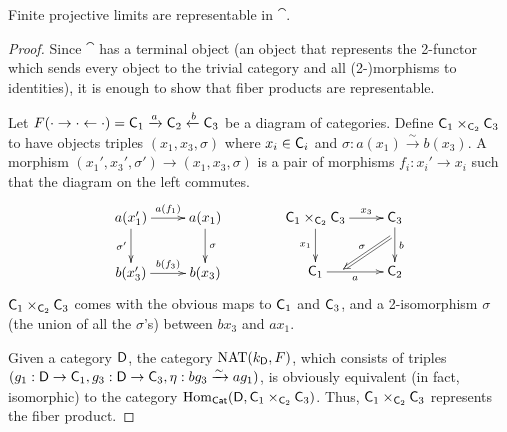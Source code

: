  \begin{lemma} \label{ApdxL:proj_limits_in_CAT}
   Finite projective limits are representable in $\cat$.
 \end{lemma}
 \begin{proof}
   Since $\cat$ has a terminal object (an object that represents the 2-functor which
   sends every object to the trivial category and all (2-)morphisms to identities), it is
   enough to show that fiber products are representable.

   Let $F(\cdot\to \cdot\leftarrow \cdot)=\text{\sf C}_1\xrightarrow a \text{\sf C}_2 \xleftarrow b \text{\sf C}_3$ be
   a diagram of categories. Define $\text{\sf C}_1\times_{\text{\sf C}_2}\text{\sf C}_3$ to have objects triples
   $(x_1,x_3,\sigma)$ where $x_i\in \text{\sf C}_i$ and $\sigma:a(x_1)\xrightarrow\sim b(x_3)$. A
   morphism $(x_1',x_3',\sigma')\to (x_1,x_3,\sigma)$ is a pair of morphisms $f_i:x_i'\to
   x_i$ such that the diagram on the left commutes.
   \[\xymatrix{
    a(x_1')\ar[r]^{a(f_1)}\ar[d]_{\sigma'} & a(x_1) \ar[d]^\sigma\\
    b(x_3')\ar[r]^{b(f_3)}& b(x_3)
   }\qquad\qquad
   \xymatrix{
    \C_1\times_{\C_2}\C_3 \ar[r]^<>(.5){x_3}\ar[d]_{x_1} & \C_3\ar[d]^b_(.3){}="a"\\
    \C_1 \ar[r]_a^(.3){}="b" & \C_2 \ar@{=>}_\sigma "a";"b"
   }\]
    $\text{\sf C}_1\times_{\text{\sf C}_2}\text{\sf C}_3$ comes with the obvious maps to $\text{\sf C}_1$ and $\text{\sf C}_3$, and a
   2-isomorphism $\sigma$ (the union of all the $\sigma$'s) between $bx_3$ and $ax_1$.

   Given a category $\text{\sf D}$, the category $\operatorname{NAT}(k_{\text{\sf D}},F)$, which consists of triples
   $(g_1:\text{\sf D}\to \text{\sf C}_1,g_3:\text{\sf D}\to \text{\sf C}_3, \eta:bg_3\xrightarrow\sim ag_1)$, is obviously
   equivalent (in fact, isomorphic) to the category
   $\operatorname{Hom}_{\text{\sf Cat}}(\text{\sf D},\text{\sf C}_1\times_{\text{\sf C}_2}\text{\sf C}_3)$. Thus, $\text{\sf C}_1\times_{\text{\sf C}_2}\text{\sf C}_3$ represents the
   fiber product.
 \end{proof}
